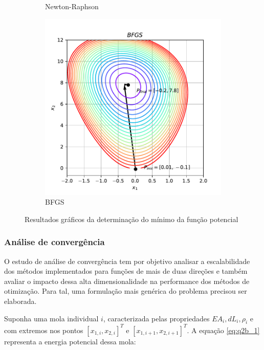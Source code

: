 \documentclass[10pt, a4paper]{article}
\begin{document}
\begin{figure}[htpb]
\begin{subfigure}[b]{0.32\textwidth}
    \caption{Newton-Raphson}
    \label{fig:q2a_newtnraph}
  \end{subfigure}
  \hfill
  \begin{subfigure}[b]{0.32\textwidth}
    \centering
    \includegraphics[width=\textwidth]{images/q2a_BFGS.pdf}
    \caption{BFGS}
    \label{fig:q2a_bfgs}
  \end{subfigure}
     \caption{Resultados gráficos da determinação do mínimo da função potencial}
     \label{fig:q2a}
\end{figure}

\subsubsection{Análise de convergência}

O estudo de análise de convergência tem por objetivo analisar a escalabilidade dos métodos implementados
para funções de mais de duas direções e também avaliar o impacto dessa alta dimensionalidade na performance dos
métodos de otimização. Para tal, uma formulação mais genérica do problema precisou ser elaborada.

Suponha uma mola individual $i$, caracterizada pelas propriedades $EA_i, dL_i, \rho_i$ e com extremos nos pontos
$[x_{1,i}, x_{2,i}]^T$ e $[x_{1,i+1}, x_{2,i+1}]^T$. A equação \ref{eq:q2b_1} representa a energia potencial dessa mola:
\end{document}
